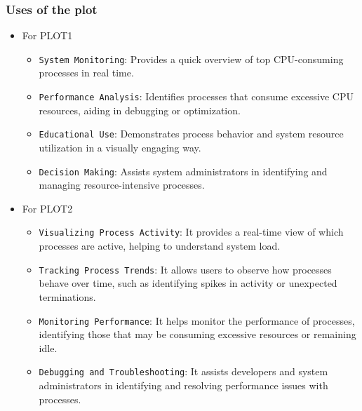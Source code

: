\documentclass[12pt]{article}
\begin{document}
\subsubsection{Uses of the plot}
\begin{itemize}
    \item For PLOT1
    \begin{itemize}
        \item \texttt{System Monitoring}: Provides a quick overview of top CPU-consuming processes in real time.

        \item \texttt{Performance Analysis}: Identifies processes that consume excessive CPU resources, aiding in debugging or optimization.

        \item \texttt{Educational Use}: Demonstrates process behavior and system resource utilization in a visually engaging way.
        
        \item \texttt{Decision Making}: Assists system administrators in identifying and managing resource-intensive processes.

    \end{itemize}
    \item For PLOT2
    \begin{itemize}
        \item \texttt{Visualizing Process Activity}: It provides a real-time view of which processes are active, helping to understand system load.
        \item \texttt{Tracking Process Trends}: It allows users to observe how processes behave over time, such as identifying spikes in activity or unexpected terminations.

        \item \texttt{Monitoring Performance}: It helps monitor the performance of processes, identifying those that may be consuming excessive resources or remaining idle.

        \item \texttt{Debugging and Troubleshooting}: It assists developers and system administrators in identifying and resolving performance issues with processes.

    \end{itemize}

\end{itemize}

\bigskip
\end{document}
